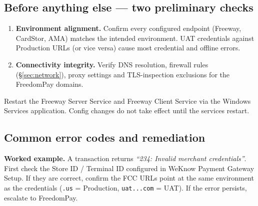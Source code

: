 \documentclass[a4paper,10pt]{article}
\begin{document}
\subsection{Before anything else --- two preliminary checks}

\begin{enumerate}
  \item \textbf{Environment alignment.} Confirm every configured endpoint
        (Freeway, CardStor, AMA) matches the intended environment. UAT
        credentials against Production URLs (or vice versa) cause most
        credential and offline errors.
  \item \textbf{Connectivity integrity.} Verify DNS resolution, firewall
        rules (\S\ref{sec:network}), proxy settings and TLS-inspection
        exclusions for the FreedomPay domains.
\end{enumerate}

\begin{wkwarn}
Restart the Freeway Server Service and Freeway Client Service via the
Windows Services application. Config changes do not take effect until
the services restart.
\end{wkwarn}

\subsection{Common error codes and remediation}

\textbf{Worked example.} A transaction returns
\emph{``234: Invalid merchant credentials''}. First check the Store ID /
Terminal ID configured in WeKnow Payment Gateway Setup. If they are
correct, confirm the FCC URLs point at the same environment as the
credentials (\texttt{.us} = Production, \texttt{uat...com} = UAT). If the
error persists, escalate to FreedomPay.
\end{document}
